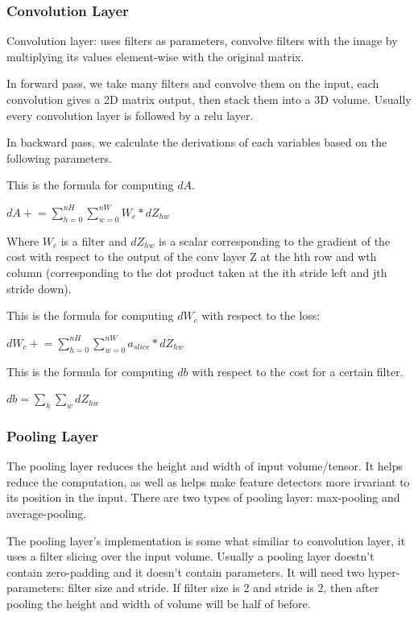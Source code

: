 \documentclass{article}
\begin{document}
	\subsubsection{Convolution Layer}
	\begin{flushleft}
		Convolution layer: uses filters as parameters, convolve filters with the image by multiplying its values element-wise with the original matrix.
	\end{flushleft}
	\begin{flushleft}
		In forward pass, we take many filters and convolve them on the input, each convolution gives a 2D matrix output, then stack them into a 3D volume. Usually every convolution layer is followed by a relu layer.
	\end{flushleft}
	\begin{flushleft}
		In backward pass, we calculate the derivations of each variables based on the following parameters.
	\end{flushleft}
	This is the formula for computing $dA$.
	\begin{center}
		$dA \mathrel{+}= \sum_{h=0}^{nH} \sum_{w=0}^{nW} W_c * dZ_{hw}$
	\end{center}
	\begin{flushleft}
		Where $W_c$ is a filter and $dZ_{hw}$ is a scalar corresponding to the gradient of the cost with respect to the output of the conv layer Z at the hth row and wth column (corresponding to the dot product taken at the ith stride left and jth stride down).	
	\end{flushleft}
	\begin{flushleft}
		This is the formula for computing $dW_c$ with respect to the loss:
	\end{flushleft}
	\begin{center}
		$dW_c \mathrel{+}= \sum_{h=0}^{nH}\sum_{w=0}^{nW} a_{slice}*dZ_{hw}$ 
	\end{center}
	\begin{flushleft}
		This is the formula for computing $db$ with respect to the cost for a certain filter.
	\end{flushleft}
	\begin{center}
		$db = \sum_h \sum_w dZ_{hw}$
	\end{center}
	\subsubsection{Pooling Layer}
	\begin{flushleft}
		The pooling layer reduces the height and width of input volume/tensor. It helps reduce the computation, as well as helps make feature detectors more irvariant to its position in the input. There are two types of pooling layer: max-pooling and average-pooling.
	\end{flushleft}
	\begin{flushleft}
		The pooling layer's implementation is some what similiar to convolution layer, it uses a filter slicing over the input volume. Usually a pooling layer doestn't contain zero-padding and it doesn't contain parameters. It will need two hyper-parameters: filter size and stride. If filter size is 2 and stride is 2, then after pooling the height and width of volume will be half of before.
	\end{flushleft}
\end{document}
